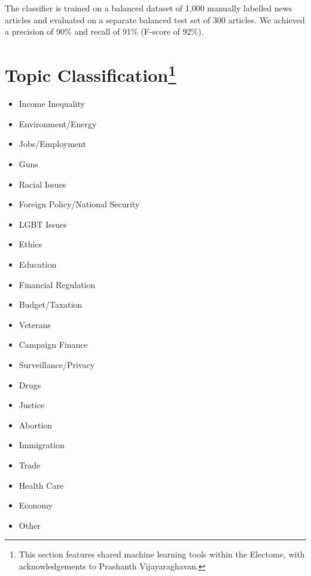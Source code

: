 The classifier is trained on a balanced dataset of 1,000 manually labelled news articles and evaluated on a separate balanced test set of 300 articles. We achieved a precision of 90\% and recall of 91\% (F-score of 92\%). 

  

\section[Topic Classification] {Topic Classification\footnote{This section features shared machine learning tools within the Electome, with acknowledgements to Prashanth Vijayaraghavan.}} 

\begin{multicols}{2}
    \begin{itemize}
    \itemsep-1em 
      \item Income Inequality
      \item Environment/Energy
      \item Jobs/Employment
      \item Guns
      \item Racial Issues
      \item Foreign Policy/National Security
      \item LGBT Issues
      \item Ethics
      \item Education
      \item Financial Regulation
      \item Budget/Taxation
      \item Veterans
      \item Campaign Finance
      \item Surveillance/Privacy
      \item Drugs
      \item Justice
      \item Abortion
      \item Immigration
      \item Trade
      \item Health Care
      \item Economy
      \item Other 
    \end{itemize}
\end{multicols}
 


